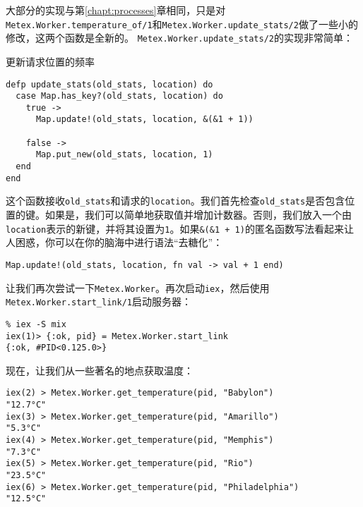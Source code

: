 大部分的实现与第\ref{chapt:processes}章相同，只是对\texttt{Metex.Worker.temperature\_of/1}和\texttt{Metex.Worker.update\_stats/2}做了一些小的修改，这两个函数是全新的。
\texttt{Metex.Worker.update\_stats/2}的实现非常简单：

\begin{code}{更新请求位置的频率}
\begin{verbatim}
defp update_stats(old_stats, location) do
  case Map.has_key?(old_stats, location) do
    true ->
      Map.update!(old_stats, location, &(&1 + 1))

    false ->
      Map.put_new(old_stats, location, 1)
  end
end
\end{verbatim}
\label{lst:update_stats}
\end{code}

这个函数接收\texttt{old\_stats}和请求的\texttt{location}。我们首先检查\texttt{old\_stats}是否包含位置的键。如果是，我们可以简单地获取值并增加计数器。否则，我们放入一个由\texttt{location}表示的新键，并将其设置为\texttt{1}。如果\texttt{\&(\&1 + 1)}的匿名函数写法看起来让人困惑，你可以在你的脑海中进行语法``去糖化''：

\begin{code}{}
\begin{verbatim}
Map.update!(old_stats, location, fn val -> val + 1 end)
\end{verbatim}
\end{code}

让我们再次尝试一下\texttt{Metex.Worker}。再次启动\texttt{iex}，然后使用\texttt{Metex.Worker.start\_link/1}启动服务器：

\begin{code}{}
\begin{verbatim}
% iex -S mix
iex(1)> {:ok, pid} = Metex.Worker.start_link
{:ok, #PID<0.125.0>}
\end{verbatim}
\end{code}

现在，让我们从一些著名的地点获取温度：

\begin{code}{}
\begin{verbatim}
iex(2) > Metex.Worker.get_temperature(pid, "Babylon")
"12.7°C"
iex(3) > Metex.Worker.get_temperature(pid, "Amarillo")
"5.3°C"
iex(4) > Metex.Worker.get_temperature(pid, "Memphis")
"7.3°C"
iex(5) > Metex.Worker.get_temperature(pid, "Rio")
"23.5°C"
iex(6) > Metex.Worker.get_temperature(pid, "Philadelphia")
"12.5°C"
\end{verbatim}
\end{code}


